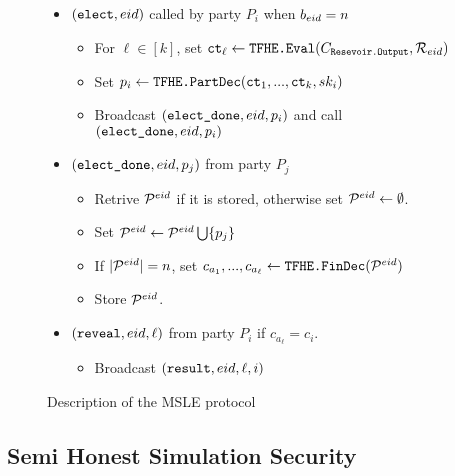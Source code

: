 \begin{figure}[H]
{\begin{minipage}{1\textwidth}
\begin{itemize}
				\item $(\texttt{elect}, {eid})$ called by party $P_i$ when  $b_{eid} = n$
				      \begin{itemize}
					      \item For $\ell \in [k]$, set $\texttt{ct}_{\ell} \gets \texttt{TFHE.Eval}(C_{\texttt{Resevoir.Output}}, \mathcal{R}_{eid})$
					      \item Set $p_i \gets \texttt{TFHE.PartDec}(\texttt{ct}_1, ..., \texttt{ct}_k, sk_i)$
					      \item Broadcast $(\texttt{elect\_done}, {eid}, p_i)$ and call $(\texttt{elect\_done}, {eid}, p_i)$
				      \end{itemize}
				\item $(\texttt{elect\_done}, {eid}, p_j)$ from party $P_j$
				      \begin{itemize}
					      \item Retrive $\mathcal{P}^{eid}$ if it is stored, otherwise set $\mathcal{P}^{eid} \gets \emptyset$.
					      \item Set $\mathcal{P}^{eid} \gets \mathcal{P}^{eid} \bigcup \{p_j\}$
					      \item If $|\mathcal{P}^{eid}| = n$, set $c_{a_1}, ..., c_{a_\ell} \gets \texttt{TFHE.FinDec}(\mathcal{P}^{eid})$
					      \item Store $\mathcal{P}^{eid}$.
				      \end{itemize}
				\item $(\texttt{reveal}, {eid}, \ell)$ from party $P_i$ if $c_{a_\ell} = c_i$.
				      \begin{itemize}
					      \item Broadcast $(\texttt{result}, {eid}, \ell, i)$
				      \end{itemize}
			\end{itemize}
		\end{minipage}
	}
	\caption{Description of the MSLE protocol}
	\label{fig:protocolMSLE}
\end{figure}


\subsection{Semi Honest Simulation Security}



